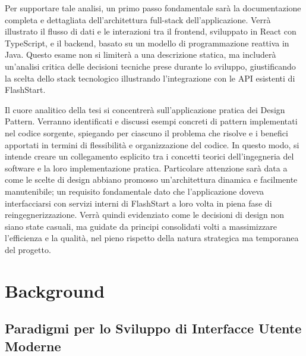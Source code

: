 \documentclass[12pt,a4paper,openright,twoside]{book}
\begin{document}
Per supportare tale analisi, un primo passo fondamentale sarà la documentazione completa e dettagliata dell'architettura full-stack dell'applicazione. Verrà illustrato il flusso di dati e le interazioni tra il frontend, sviluppato in React con TypeScript, e il backend, basato su un modello di programmazione reattiva in Java. Questo esame non si limiterà a una descrizione statica, ma includerà un'analisi critica delle decisioni tecniche prese durante lo sviluppo, giustificando la scelta dello stack tecnologico illustrando l'integrazione con le API esistenti di FlashStart.

Il cuore analitico della tesi si concentrerà sull'applicazione pratica dei Design Pattern. Verranno identificati e discussi esempi concreti di pattern implementati nel codice sorgente, spiegando per ciascuno il problema che risolve e i benefici apportati in termini di flessibilità e organizzazione del codice. In questo modo, si intende creare un collegamento esplicito tra i concetti teorici dell'ingegneria del software e la loro implementazione pratica. Particolare attenzione sarà data a come le scelte di design abbiano promosso un'architettura dinamica e facilmente manutenibile; un requisito fondamentale dato che l'applicazione doveva interfacciarsi con servizi interni di FlashStart a loro volta in piena fase di reingegnerizzazione. Verrà quindi evidenziato come le decisioni di design non siano state casuali, ma guidate da principi consolidati volti a massimizzare l'efficienza e la qualità, nel pieno rispetto della natura strategica ma temporanea del progetto.

\chapter{Background}
\label{chap:background}

\section{Paradigmi per lo Sviluppo di Interfacce Utente Moderne}
\end{document}
